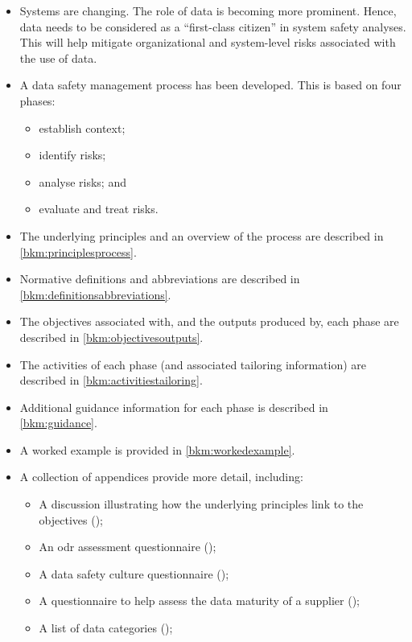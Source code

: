 \begin{itemize}
  \item Systems are changing. The role of data is becoming more prominent. Hence, data needs to be considered as a ``first-class citizen'' in system safety analyses. This will help mitigate organizational and system-level risks associated with the use of data.

  \item A data safety management process has been developed. This is based on four phases:
    \begin{itemize}
      \item establish context;
      \item identify risks;
      \item analyse risks; and
      \item evaluate and \gls{treat} risks.
    \end{itemize}
	\item The underlying principles and an overview of the process are described in \autoref{bkm:principlesprocess}.
	\item Normative definitions and abbreviations are described in \autoref{bkm:definitionsabbreviations}.
	\item The objectives associated with, and the outputs produced by, each phase are described in \autoref{bkm:objectivesoutputs}.
	\item The activities of each phase (and associated \gls{tailoring} \gls{information}) are described in \autoref{bkm:activitiestailoring}.
	\item Additional guidance \gls{information} for each phase is described in \autoref{bkm:guidance}.
  \item A worked example is provided in \autoref{bkm:workedexample}.
  \item A collection of appendices provide more detail, including:
    \begin{itemize}
      \item A discussion illustrating how the underlying principles link to the objectives (); 
      \item An \gls{odr} assessment questionnaire ();
      \item A data safety culture questionnaire ();
      \item A questionnaire to help assess the data maturity of a supplier ();
      \item A list of data categories ();

\end{itemize}
\end{itemize}
